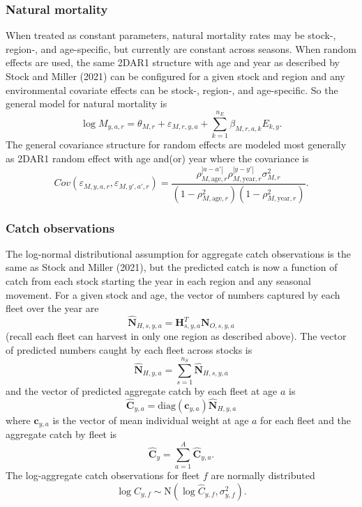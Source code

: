 \documentclass[
]{article}
\begin{document}
\hypertarget{natural-mortality}{%
\subsubsection*{Natural mortality}\label{natural-mortality}}

When treated as constant parameters, natural mortality rates may be stock-, region-, and age-specific, but currently are constant across seasons. When random effects are used, the same 2DAR1 structure with age and year as described by Stock and Miller (2021) can be configured for a given stock and region and any environmental covariate effects can be stock-, region-, and age-specific. So the general model for natural mortality is
\begin{equation*}
  \log M_{y,a,r} = \theta_{M,r} + \varepsilon_{M,r,y,a} + \sum^{n_E}_{k=1} \beta_{M,r,a,k} E_{k,y}.
\end{equation*}
The general covariance structure for random effects are modeled most generally as 2DAR1 random effect with age and(or) year where the covariance is
\begin{equation*}
  Cov\left(\varepsilon_{M,y,a,r},\varepsilon_{M,y',a',r}\right) =   \frac{\rho_{M,\text{age},r}^{|a-a'|}\rho_{M,\text{year},r}^{|y-y'|}\sigma^2_{M,r}}{\left(1 -  \rho_{M,\text{age},r}^2\right)\left(1 - \rho_{M,\text{year},r}^2\right)}.
\end{equation*}

\hypertarget{catch-observations}{%
\subsubsection*{Catch observations}\label{catch-observations}}

The log-normal distributional assumption for aggregate catch observations is the same as Stock and Miller (2021), but the predicted catch is now a function of catch from each stock starting the year in each region and any seasonal movement. For a given stock and age, the vector of numbers captured by each fleet over the year are
\[\widehat{\mathbf{N}}_{H,s,y,a} = \mathbf{H}_{s,y,a}^T \mathbf{N}_{O,s,y,a}\]
(recall each fleet can harvest in only one region as described above). The vector of predicted numbers caught by each fleet across stocks is
\[\widehat{\mathbf{N}}_{H,y,a} = \sum^{n_S}_{s=1} \widehat{\mathbf{N}}_{H,s,y,a}\]
and the vector of predicted aggregate catch by each fleet at age \(a\) is
\[\widehat{\mathbf{C}}_{y,a} = \text{diag}\left(\mathbf{c}_{y,a}\right) \widehat{\mathbf{N}}_{H,y,a}\]
where \(\mathbf{c}_{y,a}\) is the vector of mean individual weight at age \(a\) for each fleet and the aggregate catch by fleet is
\[\widehat{\mathbf{C}}_y = \sum^{A}_{a=1} \widehat{\mathbf{C}}_{y,a}.\]
The log-aggregate catch observations for fleet \(f\) are normally distributed
\[ \log C_{y,f} \sim \text{N}\left(\log \widehat {C}_{y,f}, \sigma^2_{y,f}\right).\]
\end{document}
